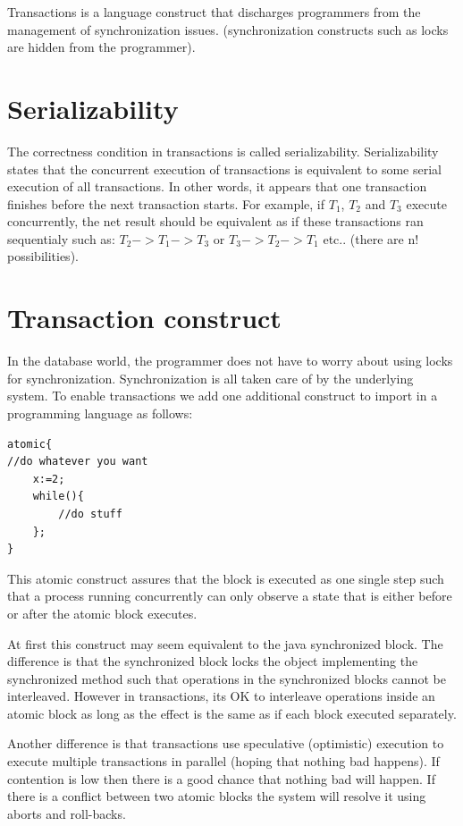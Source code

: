 \documentclass[twoside]{article}
\begin{document}
Transactions is a language construct that discharges programmers from the management of synchronization issues. (synchronization constructs such as locks are hidden from the programmer). 

\section{Serializability}
The correctness condition in transactions is called serializability. Serializability states that the concurrent execution of transactions is equivalent to some serial execution of all transactions. In other words, it appears that one transaction finishes before the next transaction starts.
For example, if $T_1$, $T_2$ and $T_3$ execute concurrently, the net result should be equivalent as if these transactions ran sequentialy such as: $T_2 -> T_1 -> T_3$ or $T_3 -> T_2 -> T_1$ etc.. (there are n! possibilities).

\section{Transaction construct}
In the database world, the programmer does not have to worry about using locks for synchronization. Synchronization is all taken care of by the underlying system.
To enable transactions we add one additional construct to import in a programming language as follows:

\begin{lstlisting}
atomic{
//do whatever you want
	x:=2;
    while(){
    	//do stuff
    };
}
\end{lstlisting}

This atomic construct assures that the block is executed as one single step such that a process running concurrently can only observe a state that is either before or after the atomic block executes.

At first this construct may seem equivalent to the java synchronized block. The difference is that the synchronized block locks the object implementing the synchronized method such that operations in the synchronized blocks cannot be interleaved. However in transactions, its OK to interleave operations inside an atomic block as long as the effect is the same as if each block executed separately. 

Another difference is that transactions use speculative (optimistic) execution to execute multiple transactions in parallel (hoping that nothing bad happens). If contention is low then there is a good chance that nothing bad will happen. If there is a conflict between two atomic blocks the system will resolve it using aborts and roll-backs.
\end{document}
